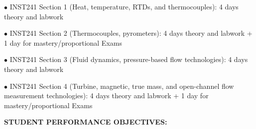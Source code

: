 \vskip 5pt

\item{$\bullet$} INST241 Section 1 (Heat, temperature, RTDs, and thermocouples): 4 days theory and labwork
\item{$\bullet$} INST241 Section 2 (Thermocouples, pyrometers): 4 days theory and labwork + 1 day for mastery/proportional Exams
\item{$\bullet$} INST241 Section 3 (Fluid dynamics, pressure-based flow technologies): 4 days theory and labwork
\item{$\bullet$} INST241 Section 4 (Turbine, magnetic, true mass, and open-channel flow measurement technologies): 4 days theory and labwork + 1 day for mastery/proportional Exams


\vfil \eject

\noindent
{\bf STUDENT PERFORMANCE OBJECTIVES:}


